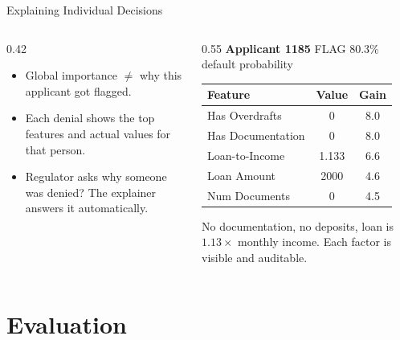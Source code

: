 \documentclass[aspectratio=169, 10pt]{beamer}
\begin{document}
\begin{frame}{Explaining Individual Decisions}
 \begin{columns}[T]

 \begin{column}{0.42\textwidth}
 \begin{itemize}
 \item Global importance $\neq$ why \alert{this}
 applicant got flagged.
 \vspace{0.6em}
 \item Each denial shows the top features and
 actual values for that person.
 \vspace{0.6em}
 \item Regulator asks why someone was denied?
 The explainer answers it automatically.
 \end{itemize}
 \end{column}

 \begin{column}{0.55\textwidth}
 \footnotesize
 \textbf{Applicant 1185} \hfill
 \alert{FLAG 80.3\% default probability}

 \vspace{0.5em}
 \begin{tabular}{@{}lcc@{}}
 \toprule
 Feature & Value & Gain \\
 \midrule
 Has Overdrafts & 0 & 8.0 \\
 Has Documentation & 0 & 8.0 \\
 Loan-to-Income & 1.133 & 6.6 \\
 Loan Amount & 2000 & 4.6 \\
 Num Documents & 0 & 4.5 \\
 \bottomrule
 \end{tabular}

 \vspace{0.5em}
 \scriptsize No documentation, no deposits, loan is
 $1.13\times$ monthly income. Each factor is
 visible and auditable.
 \end{column}

 \end{columns}
\end{frame}

\section{Evaluation}
\end{document}
